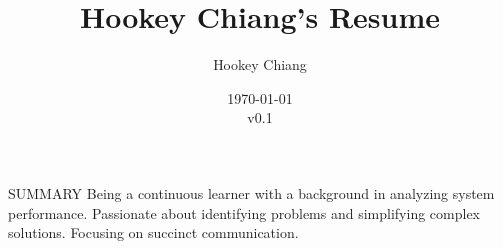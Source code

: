 \documentclass{resume} %
\title{Hookey Chiang's Resume}
\author{Hookey Chiang}
\date{\today\\v0.1}
\begin{document}

\begin{rSection}{SUMMARY} %
Being a continuous learner with a background in analyzing system performance.
Passionate about identifying problems and simplifying complex solutions.
Focusing on succinct communication.
\end{rSection} %


%
\end{document}
